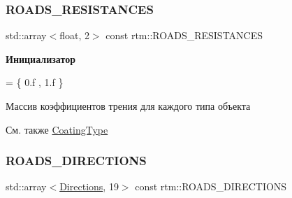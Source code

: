 \subsubsection{\texorpdfstring{R\+O\+A\+D\+S\+\_\+\+R\+E\+S\+I\+S\+T\+A\+N\+C\+ES}{ROADS\_RESISTANCES}}
{\footnotesize\ttfamily std\+::array$<$float, 2$>$ const rtm\+::\+R\+O\+A\+D\+S\+\_\+\+R\+E\+S\+I\+S\+T\+A\+N\+C\+ES}

{\bfseries Инициализатор}
\begin{DoxyCode}
= \{
        0.f     
        , 1.f   
    \}
\end{DoxyCode}
Массив коэффициентов трения для каждого типа объекта \begin{DoxySeeAlso}{См. также}
\hyperlink{namespacertm_aecd3929e64cd461eb3555b611f6fad95}{Coating\+Type} 
\end{DoxySeeAlso}
\mbox{\label{namespacertm_a7416fccc43126173ec6456c78f5474f9}} 
\subsubsection{\texorpdfstring{R\+O\+A\+D\+S\+\_\+\+D\+I\+R\+E\+C\+T\+I\+O\+NS}{ROADS\_DIRECTIONS}}
{\footnotesize\ttfamily std\+::array$<$\hyperlink{namespacertm_a4776fbfe59834ff1a16838ad6735b69a}{Directions}, 19$>$ const rtm\+::\+R\+O\+A\+D\+S\+\_\+\+D\+I\+R\+E\+C\+T\+I\+O\+NS}

